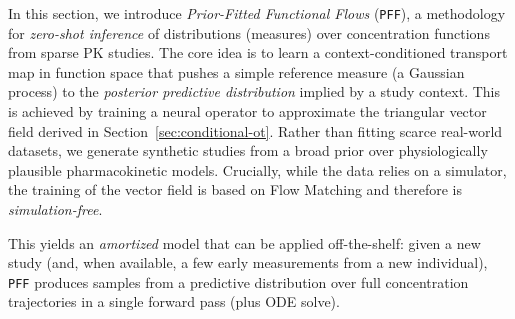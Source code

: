 \label{ssec:latent-generative}



In this section, we introduce \textit{Prior-Fitted Functional Flows} (\texttt{PFF}), a methodology for \textit{zero-shot inference} of distributions (measures) over concentration functions from sparse PK studies. 
%
The core idea is to learn a context-conditioned transport map in function space that pushes a simple reference measure (a Gaussian process) to the \textit{posterior predictive distribution} implied by a study context. 
%
This is achieved by training a neural operator to approximate the triangular vector field derived in Section~\ref{sec:conditional-ot}.
Rather than fitting scarce real-world datasets, we generate synthetic studies from a broad prior over physiologically plausible pharmacokinetic models.
Crucially, while the data relies on a simulator, the training of the vector field is based on Flow Matching and therefore is \textit{simulation-free}.
%

%
%
This yields an \textit{amortized} model that can be applied off-the-shelf: given a new study (and, when available, a few early measurements from a new individual), \texttt{PFF} produces samples from a predictive distribution over full concentration trajectories in a single forward pass (plus ODE solve).


